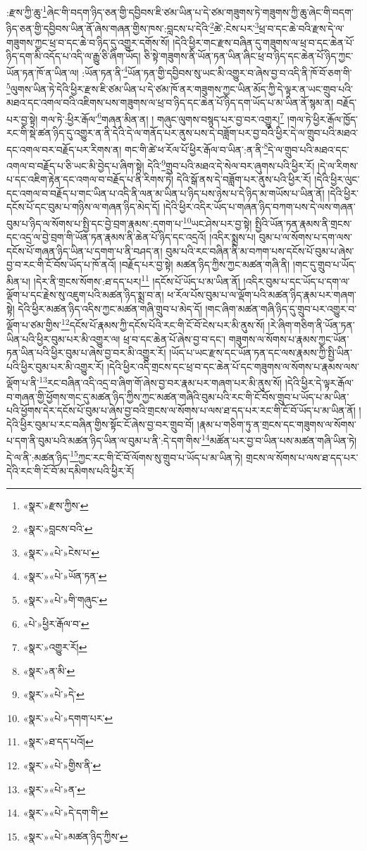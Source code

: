 :རྫས་ཀྱི་ཆུ་\footnote{«སྣར་»རྫས་ཀྱིས་}ཞེང་གི་བདག་ཉིད་ཅན་གྱི་དབྱིབས་ཇི་ཙམ་ཡིན་པ་དེ་ཙམ་གཟུགས་ཏེ་གཟུགས་ཀྱི་ཆུ་ཞེང་གི་བདག་ཉིད་ཅན་གྱི་དབྱིབས་ཡིན་ནོ་ཞེས་གཞན་གྱིས་ཁས་:བླངས་པ་དེའི་\footnote{«སྣར་»བླངས་བའི་}ཚེ་:ངེས་པར་\footnote{«སྣར་»«པེ་»ངེས་པ་}ཕྲ་བ་དང་ཆེ་བའི་རྫས་དེ་ལ་གཟུགས་ཀྱང་ཕྲ་བ་དང་ཆེ་བ་ཉིད་དུ་འགྱུར་དགོས་སོ། །དེའི་ཕྱིར་གང་རྫས་བཞིན་དུ་གཟུགས་ལ་ཕྲ་བ་དང་ཆེན་པོ་ཉིད་དག་མི་འདོད་པ་འདི་ལ་རྒྱུ་ཅི་ཞིག་ཡོད། ཅི་སྟེ་གཟུགས་ནི་ཡོན་ཏན་ཡིན་ཞིང་ཕྲ་བ་ཉིད་དང་ཆེན་པོ་ཉིད་ཀྱང་ཡོན་ཏན་ཁོ་ན་ཡིན་ལ། :ཡོན་ཏན་ནི་\footnote{«སྣར་»«པེ་»ཡོན་ཏན་}ཡོན་ཏན་གྱི་དབྱིབས་སུ་ཡང་མི་འགྱུར་བ་ཞེས་བྱ་བ་འདི་ནི་ཁོ་བོ་ཅག་གི་\footnote{«སྣར་»«པེ་»གི་གཞུང་}ལུགས་ཡིན་ཏེ་དེའི་ཕྱིར་རྫས་ཇི་ཙམ་ཡིན་པ་དེ་ཙམ་ཁོ་ནར་གཟུགས་ཀྱང་ཡིན་མོད་ཀྱི་དེ་ལྟར་ན་ཡང་གྲུབ་པའི་མཐའ་དང་འགལ་བའི་འཇིགས་པས་གཟུགས་ལ་ཕྲ་བ་ཉིད་དང་ཆེན་པོ་ཉིད་དག་ཡོད་པ་མ་ཡིན་ནོ་སྙམ་ན། བརྗོད་པར་བྱ་སྟེ། གལ་ཏེ་:ཕྱིར་རྒོལ་\footnote{«པེ་»ཕྱིར་རྒོལ་བ་}གཞན་མིན་ན། །
གཞུང་ལུགས་བསྙད་པར་བྱ་བར་འགྱུར།\footnote{«སྣར་»འགྱུར་རོ།} །གལ་ཏེ་ཕྱིར་རྒོལ་ཁྱོད་རང་གི་སྡེ་ཚན་ཉིད་དུ་འགྱུར་ན་ནི་དེའི་དེ་ལ་གནོད་པར་ནུས་པས་དེ་བཟློག་པར་བྱ་བའི་ཕྱིར་དེ་ལ་གྲུབ་པའི་མཐའ་དང་འགལ་བར་བརྗོད་པར་རིགས་ན། གང་གི་ཚེ་ཕ་རོལ་པོ་ཕྱིར་རྒོལ་བ་ཡིན་:ན་ནི་\footnote{«སྣར་»ན་མི་}དེ་ལ་གྲུབ་པའི་མཐའ་དང་འགལ་བ་བརྗོད་པ་ཅི་ཡང་མི་བྱེད་པ་ཞིག་སྟེ། དེའི་\footnote{«སྣར་»«པེ་»དེ་}གྲུབ་པའི་མཐའ་དེ་སེལ་བར་ཞུགས་པའི་ཕྱིར་རོ། །དེ་ལ་རིགས་པ་དང་འཇིག་རྟེན་དང་འགལ་བ་བརྗོད་པ་ནི་རིགས་ཏེ། དེའི་སྒོ་ནས་དེ་བཟློག་པར་ནུས་པའི་ཕྱིར་རོ། །དེའི་ཕྱིར་ལུང་དང་འགལ་བ་བརྗོད་པ་གང་ཡིན་པ་འདི་ནི་ལན་མ་ཡིན་པ་ཉིད་པས་ཉེས་པ་དེ་ཉིད་མ་གཡོས་པ་ཡིན་ནོ། །དེའི་ཕྱིར་དངོས་པོ་དང་བུམ་པ་གཉིས་ལ་གཞན་ཉིད་མེད་དོ། །དེའི་ཕྱིར་འདིར་ཡོད་པ་གཞན་ཉིད་བཀག་པས་དེ་ལས་གཞན་བུམ་པ་ཉིད་ལ་སོགས་པ་སྤྱི་དང་བྱེ་བྲག་རྣམས་:དགག་པ་\footnote{«སྣར་»«པེ་»དགག་པར་}ཡང་ཤེས་པར་བྱ་སྟེ། སྤྱིའི་ཡོན་ཏན་རྣམས་ནི་གྲངས་དང་འདྲ་ལ་བྱེ་བྲག་གི་ཡོན་ཏན་རྣམས་ནི་ཆེན་པོ་ཉིད་དང་འདྲའོ། །འདིར་སྨྲས་པ། བུམ་པ་ལ་སོགས་པ་དག་ལས་དངོས་པོ་གཞན་ཉིད་ཡིན་པ་དགག་པ་ནི་བཤད་ན། བུམ་པའི་རང་བཞིན་ནི་མ་བཀག་པས་དངོས་པོ་བུམ་པ་ཞེས་བྱ་བ་རང་གི་ངོ་བོས་ཡོད་པ་ཁོ་ནའོ། །བརྗོད་པར་བྱ་སྟེ། མཚན་ཉིད་ཀྱིས་ཀྱང་མཚན་གཞི་ནི། །གང་དུ་གྲུབ་པ་ཡོད་མིན་པ། །དེར་ནི་གྲངས་སོགས་:ཐ་དད་པར།\footnote{«སྣར་»ཐ་དད་པའོ།} །དངོས་པོ་ཡོད་པ་མ་ཡིན་ནོ། །འདིར་བུམ་པ་དང་ཡོད་པ་དག་ལ་ལྡོག་པ་དང་རྗེས་སུ་འཇུག་པའི་མཚན་ཉིད་སྨྲ་བ་ན། ཕ་རོལ་པོས་བུམ་པ་ལ་ལྡོག་པའི་མཚན་ཉིད་རྣམ་པར་གཞག་སྟེ། དེའི་ཕྱིར་མཚན་ཉིད་འདིས་ཀྱང་མཚན་གཞི་གྲུབ་པ་མེད་དོ། །གང་ཞིག་མཚན་གཞི་ཉིད་དུ་གྲུབ་པར་འགྱུར་བ་ལྡོག་པ་ཙམ་གྱིས་\footnote{«སྣར་»«པེ་»གྱིས་ནི་}དངོས་པོ་རྣམས་ཀྱི་དངོས་པོའི་རང་གི་ངོ་བོ་ངེས་པར་མི་ནུས་སོ། །རེ་ཞིག་གཅིག་ནི་ཡོན་ཏན་ཡིན་པའི་ཕྱིར་བུམ་པར་མི་འགྱུར་ལ། ཕྲ་བ་དང་ཆེན་པོ་ཞེས་བྱ་བ་དང་། གཟུགས་ལ་སོགས་པ་རྣམས་ཀྱང་ཡོན་ཏན་ཡིན་པའི་ཕྱིར་བུམ་པ་ཞེས་བྱ་བར་མི་འགྱུར་རོ། །ཡོད་པ་ཡང་རྫས་དང་ཡོན་ཏན་དང་ལས་རྣམས་ཀྱི་སྤྱི་ཡིན་པའི་ཕྱིར་བུམ་པར་མི་འགྱུར་རོ། །དེའི་ཕྱིར་འདི་གྲངས་དང་ཕྲ་བ་དང་ཆེན་པོ་དང་གཟུགས་ལ་སོགས་པ་རྣམས་ལས་ལྡོག་པ་ནི་\footnote{«སྣར་»«པེ་»ན་}རང་བཞིན་འདི་འདྲ་བ་ཞིག་གོ་ཞེས་བྱ་བར་རྣམ་པར་གཞག་པར་མི་ནུས་སོ། །དེའི་ཕྱིར་དེ་ལྟར་རྒོལ་བ་གཞན་གྱི་ཕྱོགས་གང་དུ་མཚན་ཉིད་ཀྱིས་ཀྱང་མཚན་གཞིའི་བུམ་པའི་རང་གི་ངོ་བོས་གྲུབ་པ་ཡོད་པ་མ་ཡིན་པའི་ཕྱོགས་དེར་དངོས་པོ་བུམ་པ་ཞེས་བྱ་བའི་གྲངས་ལ་སོགས་པ་ལས་ཐ་དད་པར་རང་གི་ངོ་བོ་ཡོད་པ་མ་ཡིན་ནོ། །དེའི་ཕྱིར་བུམ་པ་རང་བཞིན་གྱིས་སྟོང་ངོ་ཞེས་བྱ་བར་གྲུབ་བོ། །རྣམ་པ་གཅིག་ཏུ་ན་གྲངས་དང་གཟུགས་ལ་སོགས་པ་དག་ནི་བུམ་པའི་མཚན་ཉིད་ཡིན་ལ་བུམ་པ་ནི་:དེ་དག་གིས་\footnote{«སྣར་»«པེ་»དེ་དག་གི་}མཚོན་པར་བྱ་བ་ཡིན་པས་མཚན་གཞི་ཡིན་ཏེ། དེ་ལ་ནི་:མཚན་ཉིད་\footnote{«སྣར་»«པེ་»མཚན་ཉིད་ཀྱིས་}ཀྱང་རང་གི་ངོ་བོ་ལོགས་སུ་གྲུབ་པ་ཡོད་པ་མ་ཡིན་ཏེ། གྲངས་ལ་སོགས་པ་ལས་ཐ་དད་པར་དེའི་རང་གི་ངོ་བོ་མ་དམིགས་པའི་ཕྱིར་རོ། 